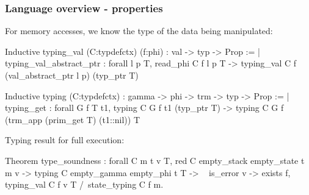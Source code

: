 \begin{frame}[fragile]
\frametitle{Language overview - properties}

For memory accesses, we know the type of the data being manipulated:
\begin{coqs}
  Inductive typing_val (C:typdefctx) (f:phi) : val -> typ -> Prop :=
    | typing_val_abstract_ptr : forall l p T,
        read_phi C f l p T ->
        typing_val C f (val_abstract_ptr l p) (typ_ptr T)

  Inductive typing (C:typdefctx) : gamma -> phi -> trm -> typ -> Prop :=
    | typing_get : forall G f T t1,
        typing C G f t1 (typ_ptr T) ->
        typing C G f (trm_app (prim_get T) (t1::nil)) T
\end{coqs}

\bigskip

Typing result for full execution:
\begin{coqs}
  Theorem type_soundness : forall C m t v T,
    red C empty_stack empty_state t m v ->
    typing C empty_gamma empty_phi t T ->
    ~ is_error v ->
    exists f, typing_val C f v T
  	  /\  state_typing C f m.
\end{coqs}

\end{frame}


